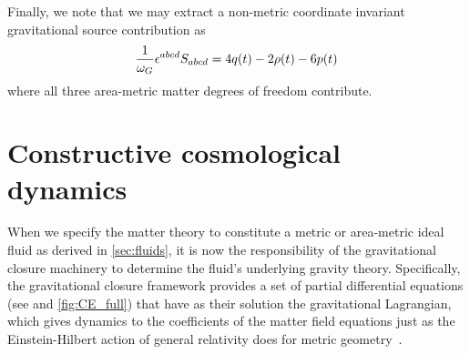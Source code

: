 Finally, we note that we may extract a non-metric coordinate invariant gravitational source contribution as
\begin{equation}
	\frac{1}{\omega_G}\epsilon^{abcd}S_{abcd}=4q(t)-2\rho(t)-6p(t)
\end{equation}
where all three area-metric matter degrees of freedom contribute.





\chapter{Constructive cosmological dynamics}\label{sec:constr_cosmo}


When we specify the matter theory to constitute a metric or area-metric ideal fluid as derived in \autoref{sec:fluids}, it is now the responsibility of the gravitational closure machinery to determine the fluid's underlying gravity theory. Specifically, the gravitational closure framework provides a set of partial differential equations (see  and \autoref{fig:CE_full}) that have as their solution the gravitational Lagrangian, which gives dynamics to the coefficients of the matter field equations just as the Einstein-Hilbert action of general relativity does for metric geometry~\autocite{Schuller2016}.


